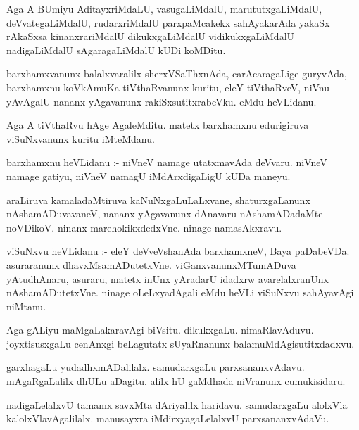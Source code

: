 \documentclass{article}
\begin{document}
\begin{mn}
Aga A BUmiyu AditayxriMdaLU,  vasugaLiMdalU,  marututxgaLiMdalU, deVvategaLiMdalU,  
rudarxriMdalU  parxpaMcakekx sahAyakarAda yakaSx rAkaSxsa kinanxrariMdalU 
dikukxgaLiMdalU  vidikukxgaLiMdalU nadigaLiMdalU sAgaragaLiMdalU kUDi koMDitu.
\end{mn}

\begin{mn}
barxhamxvanunx balalxvaralilx sherxVSaThxnAda, carAcaragaLige guryvAda, 
barxhamxnu koVkAmuKa tiVthaRvanunx kuritu, eleY tiVthaRveV,  niVnu yAvAgalU 
nananx yAgavanunx rakiSxsutitxrabeVku.  eMdu heVLidanu.
\end{mn}

\begin{mn}
Aga A tiVthaRvu hAge AgaleMditu.  matetx barxhamxnu edurigiruva viSuNxvanunx kuritu iMteMdanu.
\end{mn}

\begin{mn}
barxhamxnu heVLidanu :- niVneV namage utatxmavAda deVvaru. niVneV  namage 
gatiyu, niVneV namagU iMdArxdigaLigU kUDa maneyu.
\end{mn}

\begin{mn}
araLiruva kamaladaMtiruva  kaNuNxgaLuLaLxvane,  shaturxgaLanunx nAshamADuvavaneV, nananx 
yAgavanunx dAnavaru nAshamADadaMte  noVDikoV.  ninanx marehokikxdedxVne.  ninage namasAkxravu.
\end{mn}

\begin{mn}
viSuNxvu heVLidanu :- eleY  deVveVshanAda barxhamxneV, Baya paDabeVDa.  asuraranunx dhavxMsamADutetxVne.  
viGanxvanunxMTumADuva  yAtudhAnaru,  asuraru, matetx inUnx yAradarU idadxrw avarelalxranUnx 
nAshamADutetxVne.  ninage  oLeLxyadAgali  eMdu heVLi viSuNxvu sahAyavAgi niMtanu.
\end{mn}

\begin{mn}
Aga gALiyu  maMgaLakaravAgi biVsitu.  dikukxgaLu.  nimaRlavAduvu.  joyxtisusxgaLu  
cenAnxgi beLagutatx  sUyaRnanunx balamuMdAgisutitxdadxvu.
\end{mn}

\begin{mn}
garxhagaLu yudadhxmADalilalx.  samudarxgaLu  parxsananxvAdavu.  mAgaRgaLalilx 
dhULu aDagitu.  alilx hU gaMdhada niVranunx cumukisidaru.
\end{mn}

\begin{mn}
nadigaLelalxvU  tamamx savxMta dAriyalilx  haridavu.  samudarxgaLu alolxVla 
kalolxVlavAgalilalx.  manusayxra iMdirxyagaLelalxvU  parxsananxvAdaVu.
\end{mn}
\end{document}
